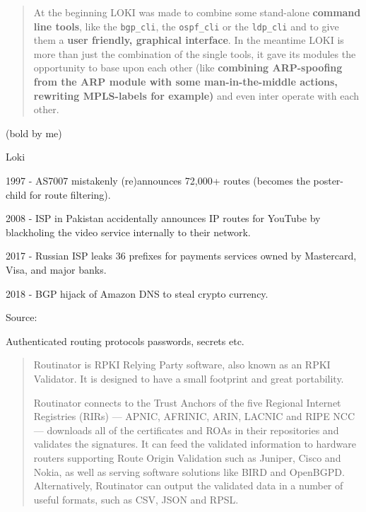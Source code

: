\documentclass[Screen16to9,17pt]{foils}
\begin{document}

\begin{quote}
At the beginning LOKI was made to combine some stand-alone {\bf command line tools}, like the \verb+bgp_cli+, the \verb+ospf_cli+ or the \verb+ldp_cli+ and to give them a {\bf user friendly, graphical interface}. In the meantime LOKI is more than just the combination of the single tools, it gave its modules the opportunity to base upon each other (like {\bf combining ARP-spoofing from the ARP module with some man-in-the-middle actions, rewriting MPLS-labels for example)} and even inter operate with each other.
\end{quote}
(bold by me)

\begin{list1}
\item {} Loki
\item {}

\end{list1}






\begin{list2}
\item 1997 - AS7007 mistakenly (re)announces 72,000+ routes (becomes the poster-child for route filtering).
\item 2008 - ISP in Pakistan accidentally announces IP routes for YouTube by blackholing the video service internally to their network.
\item 2017 - Russian ISP leaks 36 prefixes for payments services owned by Mastercard, Visa, and major banks.
\item 2018 - BGP hijack of Amazon DNS to steal crypto currency.
\end{list2}
Source: 

\begin{list1}
\item {}
\item Authenticated routing protocols passwords, secrets etc.
\end{list1}


\begin{quote}
  Routinator is RPKI Relying Party software, also known as an RPKI Validator. It is designed to have a small footprint and great portability.

Routinator connects to the Trust Anchors of the five Regional Internet Registries (RIRs) — APNIC, AFRINIC, ARIN, LACNIC and RIPE NCC — downloads all of the certificates and ROAs in their repositories and validates the signatures. It can feed the validated information to hardware routers supporting Route Origin Validation such as Juniper, Cisco and Nokia, as well as serving software solutions like BIRD and OpenBGPD. Alternatively, Routinator can output the validated data in a number of useful formats, such as CSV, JSON and RPSL.
\end{quote}
\end{document}
